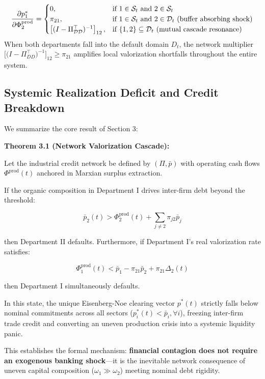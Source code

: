 \documentclass[11pt,letterpaper]{report}
\newcommand{\fitmath}[1]{\begingroup\setbox0=\hbox{$\displaystyle #1$}\ifdim\wd0>\linewidth\resizebox{\linewidth}{!}{$\displaystyle #1$}\else\displaystyle #1\fi\endgroup}
\begin{document}
\[\fitmath{\frac{\partial p_1^*}{\partial \Phi_2^{\text{prod}}} = \begin{cases} 0, & \text{if } 1 \in \mathcal{S}_t \text{ and } 2 \in \mathcal{S}_t \\ \pi_{21}, & \text{if } 1 \in \mathcal{S}_t \text{ and } 2 \in \mathcal{D}_t \text{ (buffer absorbing shock)} \\ \left[ (I - \Pi_{\mathcal{D}\mathcal{D}}^\top)^{-1} \right]_{12}, & \text{if } \{1, 2\} \subseteq \mathcal{D}_t \text{ (mutual cascade resonance)} \end{cases}}\]
When both departments fall into the default domain ${D}_{t}$, the network multiplier $[(I-{\Pi }_{DD}^{\top }{)}^{-1}{]}_{12}\geq {\pi }_{21}$ amplifies local valorization shortfalls throughout the entire system.

\subsection{Systemic Realization Deficit and Credit Breakdown}
We summarize the core result of Section 3:

\textbf{Theorem 3.1 (Network Valorization Cascade):}

Let the industrial credit network be defined by $(\Pi ,\bar{p})$ with operating cash flows ${\Phi }^{\mathrm{prod}}(t)$ anchored in Marxian surplus extraction.

If the organic composition in Department I drives inter-firm debt beyond the threshold:

\[
{\bar{p}}_{2}(t)>{\Phi }_{2}^{\mathrm{prod}}(t)+\sum_{j\ne 2}{\pi }_{j2}{\bar{p}}_{j}
\]

then Department II defaults. Furthermore, if Department I's real valorization rate satisfies:

\[
{\Phi }_{1}^{\mathrm{prod}}(t)<{\bar{p}}_{1}-{\pi }_{21}{\bar{p}}_{2}+{\pi }_{21}{\Delta }_{2}(t)
\]

then Department I simultaneously defaults.

In this state, the unique Eisenberg-Noe clearing vector ${p}^{*}(t)$ strictly falls below nominal commitments across all sectors (${p}_{i}^{*}(t)<{\bar{p}}_{i},\forall i$), freezing inter-firm trade credit and converting an uneven production crisis into a systemic liquidity panic.

This establishes the formal mechanism: \textbf{financial contagion does not require an exogenous banking shock}---it is the inevitable network consequence of uneven capital composition (${\omega }_{1}\gg {\omega }_{2}$) meeting nominal debt rigidity.
\end{document}

